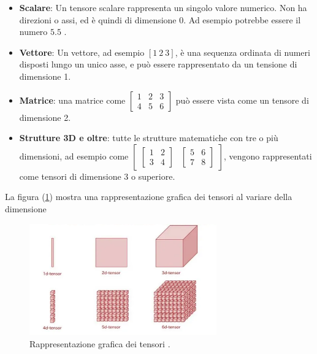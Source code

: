 \begin{itemize}
    \item \textbf{Scalare}: Un tensore scalare rappresenta un singolo valore numerico. 
    Non ha direzioni o assi, ed è quindi di dimensione 0. 
    Ad esempio potrebbe essere il numero $5.5$ . 

    \item \textbf{Vettore}: Un vettore, ad esempio $[1\ 2\ 3]$, è una sequenza ordinata 
    di numeri disposti lungo un unico asse, e può essere rappresentato da un tensione di 
    dimensione 1.
  
    \item \textbf{Matrice}: una matrice come $\begin{bmatrix} 1 & 2 & 3 \\ 4 & 5 & 6 \end{bmatrix}$ 
    può essere vista come un tensore di dimensione 2.

    \item \textbf{Strutture 3D e oltre}: tutte le strutture matematiche con tre o più dimensioni, 
    ad esempio come 
    $\begin{bmatrix} 
    \begin{bmatrix} 1 & 2 \\ 3 & 4 \end{bmatrix} & 
    \begin{bmatrix} 5 & 6 \\ 7 & 8 \end{bmatrix} 
    \end{bmatrix}$, vengono rappresentati come tensori di dimensione 3 o superiore.
\end{itemize}

La figura (\ref{fig:Rappresentazione_Tensori}) mostra una rappresentazione grafica dei tensori al variare 
della dimensione

\begin{figure}[H]
    \centering
    \includegraphics[width=0.72\textwidth]{Immagini/Generiche/esempio_tensori.png}
    \caption{Rappresentazione grafica dei tensori \cite{tensor_medium2} .}
    \label{fig:Rappresentazione_Tensori}
\end{figure}


